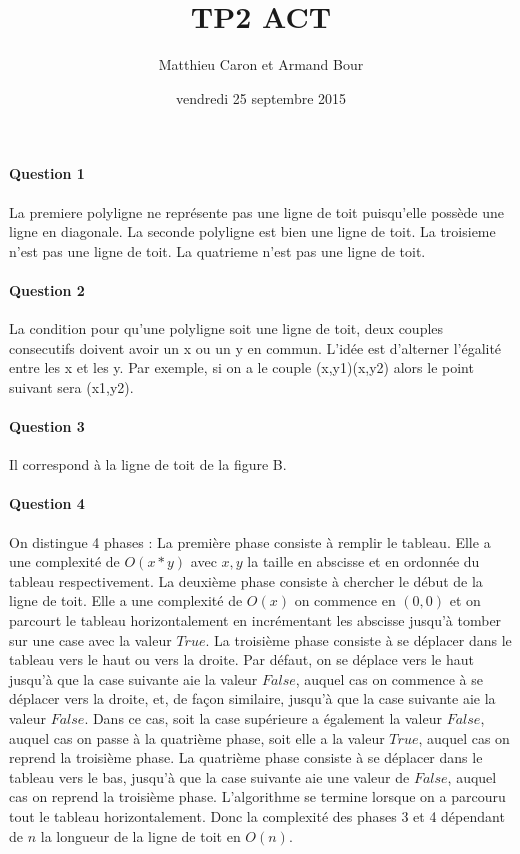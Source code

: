\documentclass[a4paper,10pt]{article}
\title{TP2 ACT}
\author{Matthieu Caron et Armand Bour}
\date{vendredi 25 septembre 2015}
\begin{document}
\maketitle

\paragraph{Question 1}
La premiere polyligne ne représente pas une ligne de toit puisqu'elle possède une ligne en diagonale.\newline
La seconde polyligne est bien une ligne de toit.\newline
La troisieme n'est pas une ligne de toit.\newline
La quatrieme n'est pas une ligne de toit.\newline
\paragraph{Question 2}
La condition pour qu'une polyligne soit une ligne de toit, deux couples consecutifs doivent avoir un x ou un y en commun.
L'idée est d'alterner l'égalité entre les x et les y.
Par exemple, si on a le couple (x,y1)(x,y2) alors le point suivant sera (x1,y2). 
\paragraph{Question 3}
Il correspond à la ligne de toit de la figure B.
\paragraph{Question 4}
On distingue 4 phases : \newline
La première phase consiste à remplir le tableau. Elle a une complexité de $O(x*y)$ avec $x,y$ la taille en abscisse et en ordonnée du tableau respectivement.\newline
La deuxième phase consiste à chercher le début de la ligne de toit. Elle a une complexité de $O(x)$ on commence en $(0,0)$ et 
on parcourt le tableau horizontalement en incrémentant les abscisse jusqu'à tomber sur une case avec la valeur $True$.\newline
La troisième phase consiste à se déplacer dans le tableau vers le haut ou vers la droite. Par défaut, on se déplace vers le haut jusqu'à que la case suivante aie la valeur $False$, 
auquel cas on commence à se déplacer vers la droite, et, de façon similaire, jusqu'à que la case suivante aie la valeur $False$. 
Dans ce cas, soit la case supérieure a également la valeur $False$, auquel cas on passe à la quatrième phase, soit elle a la valeur $True$, auquel cas on reprend la troisième phase.\newline
La quatrième phase consiste à se déplacer dans le tableau vers le bas, jusqu'à que la case suivante aie une valeur de $False$, auquel cas on reprend la troisième phase.\newline
L'algorithme se termine lorsque on a parcouru tout le tableau horizontalement.\newline
Donc la complexité des phases 3 et 4 dépendant de $n$ la longueur de la ligne de toit en $O(n)$.
\end{document}
